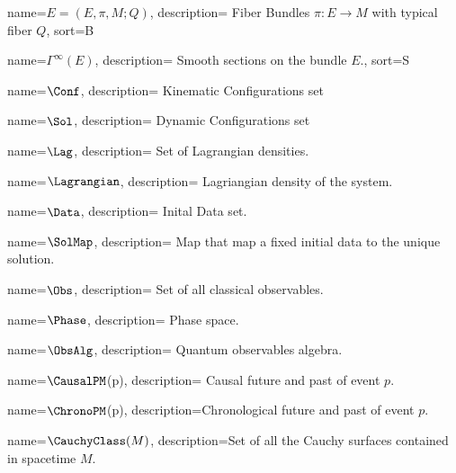 \usepackage{glossaries}

\makenoidxglossaries


%
{%
	name={\ensuremath{E = (E,\pi , M;Q)}},
	description={ Fiber Bundles $\pi: E\rightarrow M$ with typical fiber $Q$},
    sort={B}
}

%
{%
	name={\ensuremath{\Gamma^\infty(E)}},
	description={ Smooth sections on the bundle $E$.},
    sort={S}
}


	{%
		name={\ensuremath{\Conf}},
		description={ Kinematic Configurations set}
	}

	{%
		name={\ensuremath{\Sol}},
		description={ Dynamic Configurations set}
	}

		
	{%
		name={\ensuremath{\Lag}},
		description={ Set of Lagrangian densities.}
	}
		
	{%
		name={\ensuremath{\Lagrangian}},
		description={ Lagriangian density of the system.}
	}
		
	{%
		name={\ensuremath{\Data}},
		description={ Inital Data set.}
	}
		
	{%
		name={\ensuremath{\SolMap}},
		description={ Map that map a fixed initial data to the unique solution.}
	}
		
	{%
		name={\ensuremath{\Obs}},
		description={ Set of all classical observables.}
	}

	{%
		name={\ensuremath{\Phase}},
		description={ Phase space.}
	}
	
	{%
		name={\ensuremath{\ObsAlg}},
		description={ Quantum observables algebra.}
	}
	
	{%
		name={\ensuremath{\CausalPM}(p)},
		description={ Causal future and past of event $p$.}
	}	

	{%
		name={\ensuremath{\ChronoPM}(p)},
		description={Chronological future and past of event $p$.}
	}

	{%
		name={\ensuremath{\CauchyClass(M)}},
		description={Set of all the Cauchy surfaces contained in spacetime $M$.}
	}